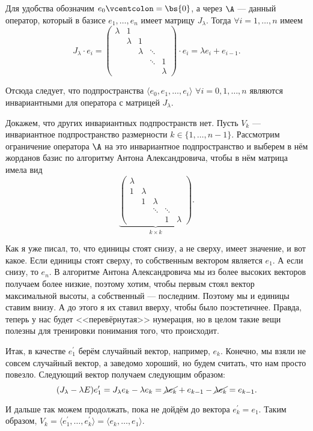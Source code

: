 \begin{solution}
    Для удобства обозначим $e_0 \vcentcolon = \bs{0}$, а через $\A$ --- данный оператор, который в базисе $e_1, \ldots, e_n$ имеет матрицу $J_\lambda$. Тогда $\forall i = 1, \ldots, n$ имеем
    \[
        J_\lambda \cdot e_i =
        \begin{pmatrix}
            \lambda & 1 &  &  &  \\
             & \lambda & 1 &  &  \\
            &  &  \lambda & \ddots &  \\
            &  &  & \ddots & 1 \\
            &  &  &  & \lambda
        \end{pmatrix} \cdot e_i = 
        \lambda e_i + e_{i - 1}.
    \]

    Отсюда следует, что подпространства $\langle e_0, e_1, \ldots, e_i\rangle$ $\forall i = 0, 1, \ldots, n$ являются инвариантными для оператора с матрицей $J_\lambda$.

    Докажем, что других инвариантных подпространств нет. Пусть $V_k$ --- инвариантное подпространство размерности $k \in \{1, \ldots, n - 1\}$. Рассмотрим ограничение оператора $\A$ на это инвариантное подпространство и выберем в нём жорданов базис по алгоритму Антона Александровича, чтобы в нём матрица имела вид
    \[
        \underbrace{\begin{pmatrix}
            \lambda & &  &  &  \\
            1 & \lambda & &  &  \\
            & 1 & \lambda & &  \\
            &  & \ddots & \ddots & \\
            &  &  & 1 & \lambda
        \end{pmatrix}}_{k \times k}.
    \]

    Как я уже писал, то, что единицы стоят снизу, а не сверху, имеет значение, и вот какое. Если единицы стоят сверху, то собственным вектором является $e_1$. А если снизу, то $e_n$. В алгоритме Антона Александровича мы из более высоких векторов получаем более низкие, поэтому хотим, чтобы первым стоял вектор максимальной высоты, а собственный --- последним. Поэтому мы и единицы ставим внизу. А до этого я их ставил вверху, чтобы было поэстетичнее. Правда, теперь у нас будет <<перевёрнутая>> нумерация, но в целом такие вещи полезны для тренировки понимания того, что происходит.

    Итак, в качестве $e_1^\prime$ берём случайный вектор, например, $e_k$. Конечно, мы взяли не совсем случайный вектор, а заведомо хороший, но будем считать, что нам просто повезло. Следующий вектор получаем следующим образом:
    \[
        (J_\lambda - \lambda E)e_1^\prime = J_\lambda e_k - \lambda e_k = \cancel{\lambda e_k} + e_{k - 1} - \cancel{\lambda e_k} = e_{k - 1}.
    \]

    И дальше так можем продолжать, пока не дойдём до вектора $e_k^\prime = e_1$. Таким образом, $V_k = \langle e_1^\prime, \ldots, e_k^\prime\rangle = \langle e_k, \ldots, e_1\rangle$.
\end{solution}

